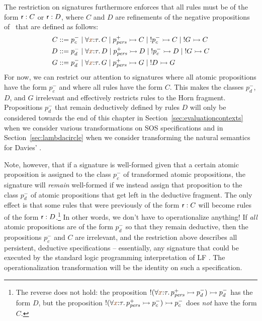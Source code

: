 The restriction on signatures furthermore enforces that all rules must
be of the form ${\sf r} : C$ or ${\sf r} : D$, where $C$ and $D$ are
refinements of the negative propositions of \sls~that are defined as
follows:
\begin{align*}
C & ::= p^-_{c} 
    \mid \forall \lf x{:}\tau.\, C
    \mid p^+_\mpers \lefti C
    \mid {!}p^-_c \lefti C
    \mid {!}G \lefti C \\
D & ::= p^-_{d}
    \mid \forall \lf x{:}\tau.\, D
    \mid p^+_\mpers \lefti D
    \mid {!}p^-_c \lefti D
    \mid {!}G \lefti C \\
G & ::= p^-_d 
    \mid \forall \lf x{:}\tau.\, G
    \mid p^+_\mpers \lefti G
    \mid {!}D \lefti G
\end{align*}
For now, we can restrict our attention to signatures where all atomic
propositions have the form $p^-_c$ and where all rules have the form
$C$. This makes the classes $p^-_d$, $D$, and $G$ irrelevant and
effectively restricts rules to the Horn fragment.  Propositions
$p^-_d$ that remain deductively defined by rules $D$ will only be
considered towards the end of this chapter in
Section~\ref{sec:evaluationcontexts} when we consider various
transformations on SOS specifications and in
Section~\ref{sec:lambdacircle} when we consider transforming the
natural semantics for Davies' \rowan.

Note, however, that if a signature is well-formed given that a certain
atomic proposition is assigned to the class $p^-_c$ of transformed
atomic propositions, the signature will {\it remain} well-formed if we
instead assign that proposition to the class $p^-_d$ of atomic
propositions that get left in the deductive fragment. The only effect
is that some rules that were previously of the form ${\sf r} : C$ will
become rules of the form ${\sf r} : D$.\footnote{The reverse does not hold:
the proposition ${!}(\forall\lf{x}{:}\tau.\,p^+_\mpers \lefti p^-_d)
\lefti p^-_d$ has the form $D$, but the proposition
${!}(\forall\lf{x}{:}\tau.\,p^+_\mpers \lefti p^-_c)
\lefti p^-_c$ does {\it not} have the form $C$.} In other words, we don't have to
operationalize anything! If {\it all} atomic propositions are of the
form $p^-_d$ so that they remain deductive, then the propositions
$p^-_c$ and $C$ are irrelevant, and the restriction above describes
all persistent, deductive specifications -- essentially, any signature
that could be executed by the standard logic programming
interpretation of LF \cite{pfenning89elf}. The operationalization
transformation will be the identity on such a specification.

